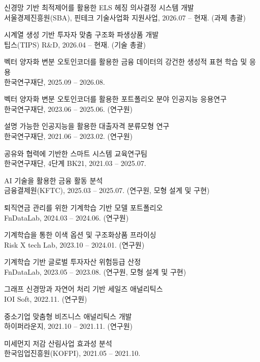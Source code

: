 \documentclass[11pt]{article}
\begin{document}
\begin{nlist}
\item[{[6]}] 신경망 기반 최적제어를 활용한 ELS 헤징 의사결정 시스템 개발\\ 서울경제진흥원(SBA), 핀테크 기술사업화 지원사업, 2026.07 – 현재. (과제 총괄)
\item[{[5]}] 시계열 생성 기반 투자자 맞춤 구조화 파생상품 개발\\ 팁스(TIPS) R\&D, 2026.04 – 현재. (기술 총괄)
\item[{[4]}] 벡터 양자화 변분 오토인코더를 활용한 금융 데이터의 강건한 생성적 표현 학습 및 응용\\ 한국연구재단, 2025.09 – 2026.08.
\item[{[3]}] 벡터 양자화 변분 오토인코더를 활용한 포트폴리오 분야 인공지능 응용연구\\ 한국연구재단, 2023.06 – 2025.06. (연구원)
\item[{[2]}] 설명 가능한 인공지능을 활용한 대출자격 분류모형 연구\\ 한국연구재단, 2021.06 – 2023.02. (연구원)
\item[{[1]}] 공유와 협력에 기반한 스마트 시스템 교육연구팀\\ 한국연구재단, 4단계 BK21, 2021.03 – 2025.07.
\end{nlist}
\begin{nlist}
\item[{[7]}] AI 기술을 활용한 금융 활동 분석\\ 금융결제원(KFTC), 2025.03 – 2025.07. (연구원, 모형 설계 및 구현)
\item[{[6]}] 퇴직연금 관리를 위한 기계학습 기반 모델 포트폴리오\\ FnDataLab, 2024.03 – 2024.06. (연구원)
\item[{[5]}] 기계학습을 통한 이색 옵션 및 구조화상품 프라이싱\\ Risk X tech Lab, 2023.10 – 2024.01. (연구원)
\item[{[4]}] 기계학습 기반 글로벌 투자자산 위험등급 산정\\ FnDataLab, 2023.05 – 2023.08. (연구원, 모형 설계 및 구현)
\item[{[3]}] 그래프 신경망과 자연어 처리 기반 세일즈 애널리틱스\\ IOI Soft, 2022.11. (연구원)
\item[{[2]}] 중소기업 맞춤형 비즈니스 애널리틱스 개발\\ 하이퍼라운지, 2021.10 – 2021.11. (연구원)
\item[{[1]}] 미세먼지 저감 산림사업 효과성 분석\\ 한국임업진흥원(KOFPI), 2021.05 – 2021.10.
\end{nlist}
\end{document}

